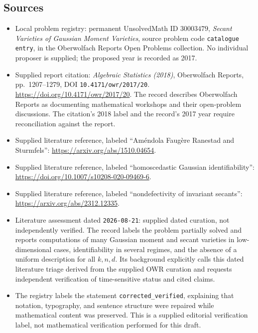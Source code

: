 \documentclass[11pt]{article}
\begin{document}
\subsection{Sources}
\begin{itemize}
\item Local problem registry: permanent UnsolvedMath ID \(30003479\), \emph{Secant Varieties of Gaussian Moment Varieties}, source problem code \texttt{catalogue entry}, in the Oberwolfach Reports Open Problems collection. No individual proposer is supplied; the proposed year is recorded as 2017.
\item Supplied report citation: \emph{Algebraic Statistics (2018)}, Oberwolfach Reports, pp.\ 1207--1279, DOI \texttt{10.4171/owr/2017/20}. \url{https://doi.org/10.4171/owr/2017/20}. The record describes Oberwolfach Reports as documenting mathematical workshops and their open-problem discussions. The citation's 2018 label and the record's 2017 year require reconciliation against the report.
\item Supplied literature reference, labeled ``Améndola Faugère Ranestad and Sturmfels'': \url{https://arxiv.org/abs/1510.04654}.
\item Supplied literature reference, labeled ``homoscedastic Gaussian identifiability'': \url{https://doi.org/10.1007/s10208-020-09469-6}.
\item Supplied literature reference, labeled ``nondefectivity of invariant secants'': \url{https://arxiv.org/abs/2312.12335}.
\item Literature assessment dated \texttt{2026-08-21}: supplied dated curation, not independently verified. The record labels the problem partially solved and reports computations of many Gaussian moment and secant varieties in low-dimensional cases, identifiability in several regimes, and the absence of a uniform description for all \(k,n,d\). Its background explicitly calls this dated literature triage derived from the supplied OWR curation and requests independent verification of time-sensitive status and cited claims.
\item The registry labels the statement \texttt{corrected\_verified}, explaining that notation, typography, and sentence structure were repaired while mathematical content was preserved. This is a supplied editorial verification label, not mathematical verification performed for this draft.
\end{itemize}
\end{document}
